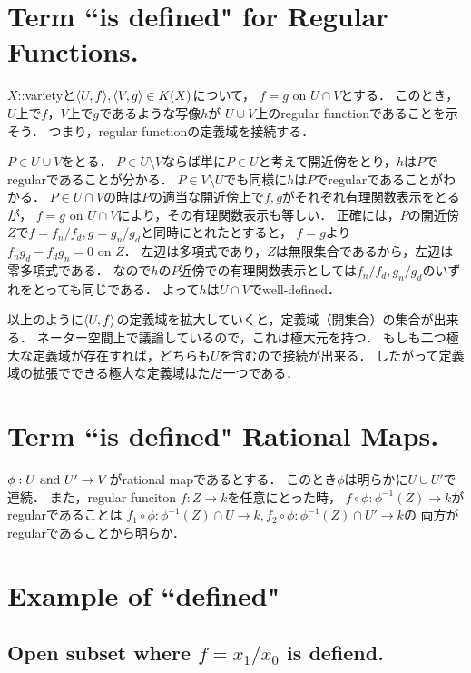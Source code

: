 \documentclass[a4paper]{jsarticle}
\newcommand{\mon}{\mbox{ on }}
\begin{document}
\section{Term ``is defined" for Regular Functions.} %
    $X$::varietyと$\langle U,f \rangle, \langle V,g \rangle \in K(X)$について，
    $f=g \mon U \cap V$とする．
    このとき，$U$上で$f$，$V$上で$g$であるような写像$h$が
    $U \cup V$上のregular functionであることを示そう．
    つまり，regular functionの定義域を接続する．

    $P \in U \cup V$をとる．
    $P \in U \setminus V$ならば単に$P \in U$と考えて開近傍をとり，$h$は$P$でregularであることが分かる．
    $P \in V \setminus U$でも同様に$h$は$P$でregularであることがわかる．
    $P \in U \cap V$の時は$P$の適当な開近傍上で$f,g$がそれぞれ有理関数表示をとるが，
    $f=g \mon U \cap V$により，その有理関数表示も等しい．
    正確には，$P$の開近傍$Z$で$f=f_n/f_d, g=g_n/g_d$と同時にとれたとすると，
    $f=g$より$f_n g_d-f_d g_n=0 \mon Z$．
    左辺は多項式であり，$Z$は無限集合であるから，左辺は零多項式である．
    なので$h$の$P$近傍での有理関数表示としては$f_n/f_d, g_n/g_d$のいずれをとっても同じである．
    よって$h$は$U \cap V$でwell-defined．

    以上のように$\langle U,f \rangle$の定義域を拡大していくと，定義域（開集合）の集合が出来る．
    ネーター空間上で議論しているので，これは極大元を持つ．
    もしも二つ極大な定義域が存在すれば，どちらも$U$を含むので接続が出来る．
    したがって定義域の拡張でできる極大な定義域はただ一つである．

\section{Term ``is defined" Rational Maps.} %
    $\phi:U \text{ and } U' \to V$がrational mapであるとする．
    このとき$\phi$は明らかに$U \cup U'$で連続．
    また，regular funciton $f:Z \to k$を任意にとった時，
    $f \circ \phi: \phi^{-1}(Z) \to k$がregularであることは
    $f_1 \circ \phi: \phi^{-1}(Z) \cap U \to k, f_2 \circ \phi: \phi^{-1}(Z) \cap U' \to k$の
    両方がregularであることから明らか．

\section{Example of ``defined"} %
    \subsection{Open subset where $f=x_1/x_0$ is defiend.}
    \subsection{}
\end{document}
